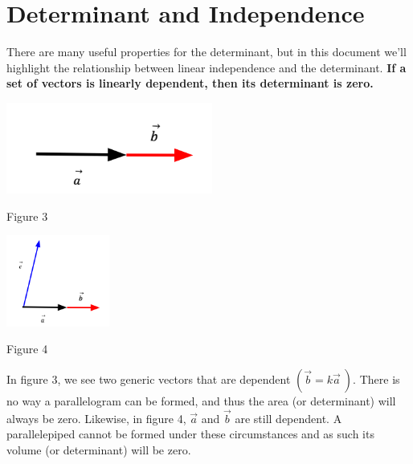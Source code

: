 \documentclass{article}
\begin{document}
\section{Determinant and Independence}
\par\noindent There are many useful properties for the determinant, but in this document we'll highlight the relationship between linear independence and the determinant. \textbf{If a set of vectors is linearly dependent, then its determinant is zero.}
\newline
\newline
\begin{minipage}[c]{.50\linewidth}
	\includegraphics[height=3cm]{no-parallelo.png}
	\begin{center}\par \noindent Figure 3\end{center}
\end{minipage}
\hspace{0.75cm}
\begin{minipage}[c]{.50\linewidth}
		\includegraphics[height=3cm]{no-piped.png}
		\begin{center}\par\noindent Figure 4\end{center}
\end{minipage}
\newline
\newline
\par\noindent In figure 3, we see two generic vectors that are dependent \( ( \vec b = k \vec a\ )\). There is no way a parallelogram can be formed, and thus the area (or determinant) will always be zero. Likewise, in figure 4, \( \vec a \) and \( \vec b\) are still dependent. A parallelepiped cannot be formed under these circumstances and as such its volume (or determinant) will be zero.
\end{document}
